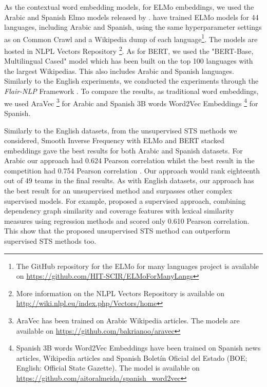 As the contextual word embedding models, for ELMo embeddings, we used the Arabic and Spanish Elmo models released by \cite{che-EtAl:2018:K18-2}. \cite{che-EtAl:2018:K18-2} have trained ELMo models for 44 languages, including Arabic and Spanish, using the same hyperparameter settings as \cite{peters-etal-2018-deep} on Common Crawl and a Wikipedia dump of each language\footnote{The GitHub repository for the ELMo for many languages project is available on \url{https://github.com/HIT-SCIR/ELMoForManyLangs}}. The models are hosted in NLPL Vectors Repository \autocite{fares-etal-2017-word}\footnote{More information on the NLPL Vectors Repository is available on \url{http://wiki.nlpl.eu/index.php/Vectors/home}}. As for BERT, we used the "BERT-Base, Multilingual Cased" model \autocite{devlin-etal-2019-bert} which has been built on the top 100 languages with the largest Wikipedias. This also includes Arabic and Spanish languages. Similarly to the English experiments, we conducted the experiments through the \textit{Flair-NLP} Framework \autocite{akbik-etal-2019-flair}. To compare the results, as traditional word embeddings,  we used AraVec \autocite{SOLIMAN2017256} \footnote{AraVec has been trained on Arabic Wikipedia articles. The models are available on \url{https://github.com/bakrianoo/aravec}} for Arabic and Spanish 3B words Word2Vec Embeddings \autocite{doi:10.1177/1550147718811827}\footnote{Spanish 3B words Word2Vec Embeddings have been trained on Spanish news articles, Wikipedia articles and Spanish Boletín Oficial del Estado (BOE; English: Official State Gazette). The model is available on \url{https://github.com/aitoralmeida/spanish_word2vec}} for Spanish.

Similarly to the English datasets, from the unsupervised STS methods we considered, Smooth Inverse Frequency with ELMo and BERT stacked embeddings gave the best results for both Arabic and Spanish datasets. For Arabic our approach had 0.624 Pearson correlation whilst the best result \autocite{wu-etal-2017-bit} in the competition had 0.754 Pearson correlation \autocite{cer-etal-2017-semeval}. Our approach would rank eighteenth out of 49 teams in the final results. As with English datasets, our approach has the best result for an unsupervised method and surpasses other complex supervised models. For example, \cite{kohail-etal-2017-sts} proposed a supervised approach, combining dependency graph similarity and coverage features with lexical similarity measures using regression methods and scored only 0.610 Pearson correlation. This show that the proposed unsupervised STS method can outperform supervised STS methods too.


